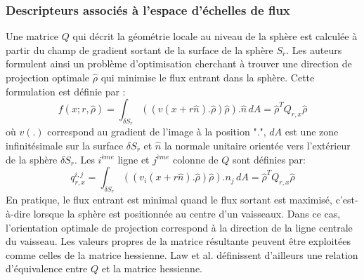 \subsubsection{Descripteurs associés à l'espace d'échelles de flux}
  Une matrice $Q$ qui décrit la géométrie locale au niveau de la sphère est calculée à partir du champ de gradient sortant de la surface de la sphère $S_r$. Les auteurs formulent ainsi un problème d'optimisation cherchant à trouver une direction de projection optimale  $\widehat{\rho}$ qui minimise le flux entrant dans la sphère. Cette formulation est définie par :
\begin{equation}
    f(x;r, \widehat{\rho} )= \int_{\delta S_r} (( v(x + r\widehat{n}).\widehat{\rho})\widehat{\rho}). \widehat{n}\,dA = \widehat{\rho}^{T}Q_{r,x}\widehat{\rho}  	\nonumber
\end{equation}
où $v(.)$ correspond au gradient de l'image à la position ".", $dA$ est une zone infinitésimale sur la surface $\delta S_r$ et $\widehat{n}$ la normale unitaire orientée vers l'extérieur de la sphère $\delta S_r$.
Les $i^{ème}$ ligne et $j^{ème}$ colonne de $Q$ sont définies par: 
\begin{equation}
    q_{r,x}^{i,j} = \int_{\delta S_r} (( v_i(x + r\widehat{n}).\widehat{\rho})\widehat{\rho}).n_j\,dA = \widehat{\rho}^{T}Q_{r,x}\widehat{\rho}  \nonumber	
\end{equation}
En pratique, le flux entrant est minimal quand le flux sortant est maximisé, c'est-à-dire lorsque la sphère est positionnée au centre d'un vaisseaux. Dans ce cas, l'orientation optimale de projection correspond à la direction de la ligne centrale du vaisseau. Les valeurs propres de la matrice résultante peuvent être exploitées comme celles de la matrice hessienne. Law et al. \cite{Law2008_OOF} définissent d'ailleurs une relation d'équivalence entre $Q$ et la matrice hessienne.


